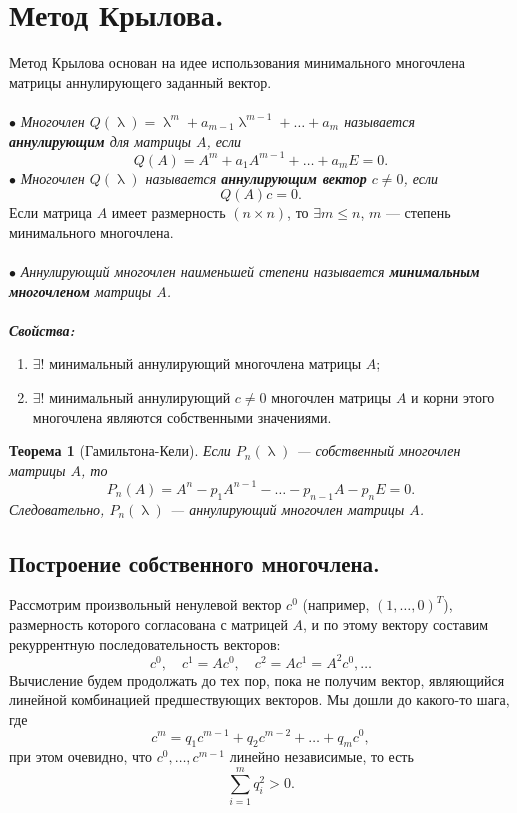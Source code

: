 \documentclass[a4paper, 12pt]{report}
\renewcommand{\leq}{\leqslant}
\renewcommand{\lambda}{\uplambda}
\newtheorem*{theorem}{Теорема}
\begin{document}
	 \section{Метод Крылова.}
	 Метод Крылова основан на идее использования минимального многочлена матрицы аннулирующего заданный вектор.\\\\
	 $\bullet$ \textit{Многочлен $Q(\lambda) = \lambda^m + a_{m-1}\lambda^{m-1} + \ldots + a_m$ называется \textbf{аннулирующим} для матрицы $A$, если} $$Q(A) = A^m + a_1A^{m-1} + \ldots + a_mE = 0.$$
	 $\bullet$ \textit{Многочлен $Q(\lambda)$ называется \textbf{аннулирующим вектор} $c\ne 0$, если $$Q(A)c = 0.$$}
	 Если матрица $A$ имеет размерность $(n\times n)$, то $\exists m \leq n$, $m$ --- степень минимального многочлена.\\\\
	 $\bullet$ \textit{Аннулирующий многочлен наименьшей степени называется \textbf{минимальным многочленом} матрицы $A$.}\\\\
	 \textbf{\textit{Свойства:}}
	 \begin{enumerate}
	 	\item $\exists !$ минимальный аннулирующий многочлена матрицы $A$;
	 	\item $\exists !$ минимальный аннулирующий $c\ne 0$ многочлен матрицы $A$ и корни этого многочлена являются собственными значениями.
	 \end{enumerate}
	 \begin{theorem}
	 	[Гамильтона-Кели] Если $P_n(\lambda)$ --- собственный многочлен матрицы $A$, то $$P_n(A) = A^n - p_1A^{n-1} - \ldots - p_{n-1}A - p_nE = 0.$$ Следовательно, $P_n(\lambda)$ --- аннулирующий многочлен матрицы $A$.
	 \end{theorem}\subsection{Построение собственного многочлена.}
	 Рассмотрим произвольный ненулевой вектор $c^0$ (например, $(1,\ldots, 0)^T$), размерность которого согласована с матрицей $A$, и по этому вектору составим рекуррентную последовательность векторов:
	 $$c^0,\quad c^1=Ac^0,\quad c^2 = Ac^1 = A^2c^0,\ldots $$
	 Вычисление будем продолжать до тех пор, пока не получим вектор, являющийся линейной комбинацией предшествующих векторов. Мы дошли до какого-то шага, где $$c^m = q_1 c^{m-1} + q_2c^{m-2} + \ldots + q_mc^0,$$
	 при этом очевидно, что $c^0,\ldots, c^{m-1}$ линейно независимые, то есть $$\sum_{i=1}^{m}q_i^2 > 0.$$
\end{document}
